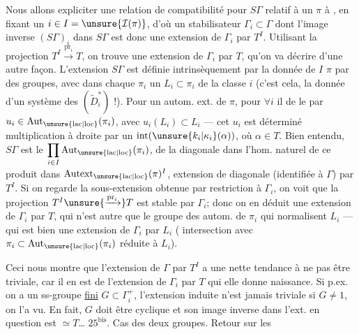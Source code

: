 Nous allons expliciter une relation de
compatibilité pour $S\Gamma$ relatif à un $\pi$
à , en fixant un $i\in I=\unsure{\mathcal I(\pi)}$,
d'où un stabilisateur $\Gamma_i\subset\Gamma$ dont l'image
inverse $(S\Gamma)_i$ dans $S\Gamma$ est donc une
extension de $\Gamma_i$ par $T^I$. Utilisant la
projection $T^I\xrightarrow{\mathrm{pr}_i}T$, on trouve une
extension de $\Gamma_i$ par $T$, qu'on va décrire
d'une autre façon. L'extension $S\Gamma$
est définie intrinsèquement par la
donnée de $I$   
 $\pi$ par des groupes, avec dans
chaque $\pi_i$ un $L_i\subset\pi_i$ de la classe $i$
(c'est cela, la donnée d'un système des
$(\widetilde D_i^*)$ !). Pour un autom. ext.   de $\pi$,
pour $\forall i$ il   de le
 par $u_i\in\operatorname{Aut}_{\unsure{\mathrm{lac}|\mathrm{loc}}}(\pi_i)$, avec $u_i(L_i)\subset L_i$
--- cet $u_i$ est déterminé  multiplication
à droite par un $\operatorname{int}(\unsure{k_i|\kappa_i}(\alpha))$, où $\alpha\in T$.
Bien entendu, $S\Gamma$ est le  
$\displaystyle\prod_{i\in I}\operatorname{Aut}_{\unsure{\mathrm{lac}|\mathrm{loc}}}(\pi_i)$,
  de la diagonale
dans l'hom. naturel de ce produit dans
$\operatorname{Autext}_{\unsure{\mathrm{lac}|\mathrm{loc}}}(\pi)^I$,   extension de
 diagonale (identifiée à $\Gamma$) par $T^I$.
Si on regarde la sous-extension  obtenue
par restriction à $\Gamma_i$, on voit que la
projection $T^I\unsure{\xrightarrow{\mathrm{pr}_i}}T$ est stable par $\Gamma_i$; donc
on en déduit une extension de $\Gamma_i$ par $T$,
qui n'est autre que le groupe des
autom.  de $\pi_i$ qui normalisent $L_i$
--- qui est bien une extension de $\Gamma_i$ par $L_i$
( intersection avec $\pi_i\subset\operatorname{Aut}_{\unsure{\mathrm{lac}|\mathrm{loc}}}(\pi_i)$ 
réduite à $L_i$).

Ceci nous montre que l'extension
de $\Gamma$ par $T^I$ a une nette tendance à
ne pas être triviale, car il en est 
 de l'extension de $\Gamma_i$ par $T$  qui elle donne
naissance. Si p.ex. on a un ss-groupe
\uline{fini} $G\subset\Gamma_i^+$, l'extension induite n'est
jamais triviale si $G\ne1$, on l'a vu. En
fait, $G$ doit être cyclique et son image inverse
dans l'ext. en question est $\simeq T$\ldots
{}
$25^{\mathrm{bis}}$. Cas des deux groupes. Retour sur les 

